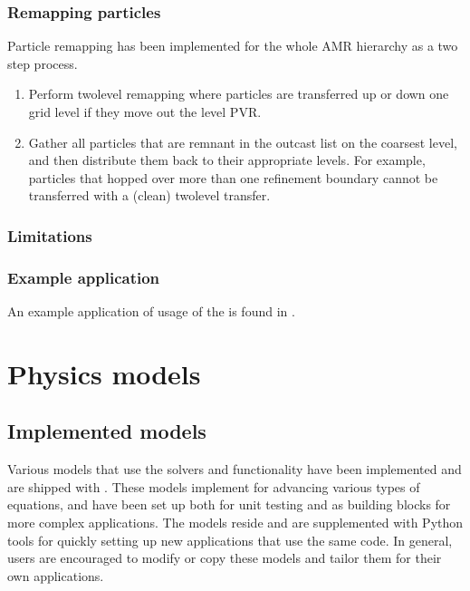 \documentclass[letterpaper,10pt,english]{sphinxmanual}
\begin{document}
\subsection{Remapping particles}
\label{\detokenize{Solvers/Ito:remapping-particles}}
Particle remapping has been implemented for the whole AMR hierarchy as a two step process.
\begin{enumerate}
%
\item {} 
Perform two\sphinxhyphen{}level remapping where particles are transferred up or down one grid level if they move out the level PVR.

\item {} 
Gather all particles that are remnant in the outcast list on the coarsest level, and then distribute them back to their appropriate levels. For example, particles that hopped over more than one refinement boundary cannot be transferred with a (clean) two\sphinxhyphen{}level transfer.

\end{enumerate}


\subsection{Limitations}
\label{\detokenize{Solvers/Ito:limitations}}

\subsection{Example application}
\label{\detokenize{Solvers/Ito:example-application}}
An example application of usage of the  is found in {\hyperref[\detokenize{Applications/BrownianWalkerModel:chap-brownianwalkermodel}]{}}.


\chapter{Physics models}
\label{\detokenize{index:physics-models}}

\section{Implemented models}
\label{\detokenize{Applications/ImplementedModels:implemented-models}}\label{\detokenize{Applications/ImplementedModels:chap-implementedmodels}}\label{\detokenize{Applications/ImplementedModels::doc}}
Various models that use the  solvers and functionality have been implemented and are shipped with .
These models implement  for advancing various types of equations, and have been set up both for unit testing and as building blocks for more complex applications.
The models reside  and are supplemented with Python tools for quickly setting up new applications that use the same code.
In general, users are encouraged to modify or copy these models and tailor them for their own applications.
\end{document}
